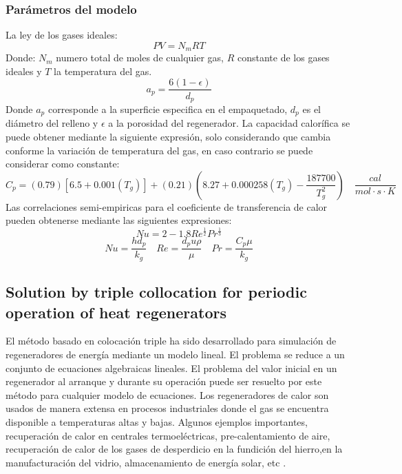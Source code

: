 \documentclass[12pt,letterpaper,final]{article}%
\begin{document}
\subsubsection*{Parámetros del modelo}
La ley de los gases ideales:
\begin{equation}
	PV=N_m R T
\end{equation}
Donde: $N_m$ numero total de moles de cualquier gas, $R$ constante de los gases ideales y $T$ la temperatura del gas.
\begin{equation}
	a_p=\frac{6(1-\epsilon)}{d_p}
\end{equation}
Donde $a_p$ corresponde a la superficie especifica en el empaquetado, $d_p$ es el diámetro del relleno y $\epsilon$ a la porosidad del regenerador. 
\newline
La capacidad calorífica se puede obtener mediante la siguiente expresión, solo considerando que cambia conforme la variación de temperatura del gas\cite{green2018perry}, en caso contrario se puede considerar como constante:
\begin{equation}
	C_p=(0.79)[6.5+0.001(T_g)] + (0.21)(8.27+0.000258(T_g)-\frac{187700}{T_g^2}) \quad \frac{cal}{mol\cdot s \cdot K}
	\end{equation}
Las correlaciones semi-empiricas para el coeficiente de transferencia de calor pueden obtenerse mediante las siguientes expresiones\cite{Levenspiel1983}:
\begin{equation}
	Nu = 2 - 1.8 Re^{\frac{1}{2}}Pr^{\frac{1}{3}}
\end{equation}
\begin{equation*}
	Nu = \frac{hd_p}{k_g} \quad Re = \frac{d_p u\rho}{\mu} \quad Pr=\frac{C_p \mu }{k_g}
\end{equation*}

\subsection*{Solution by triple collocation for periodic operation of heat regenerators}

El método basado en colocación triple ha sido desarrollado para simulación de regeneradores de energía mediante un modelo lineal. El problema se reduce a un conjunto de ecuaciones algebraicas lineales. El problema del valor inicial en un regenerador al arranque y durante su operación puede ser resuelto por este método para cualquier modelo de ecuaciones. 
\newline
Los regeneradores de calor son usados de manera extensa en procesos industriales donde el gas se encuentra disponible a temperaturas altas y bajas. Algunos ejemplos importantes, recuperación de calor en centrales termoeléctricas, pre-calentamiento de aire, recuperación de calor de los gases de desperdicio en la fundición del hierro,en la manufacturación del vidrio, almacenamiento de energía solar, etc \cite{Ramachadran1984}.
\newline
\end{document}
